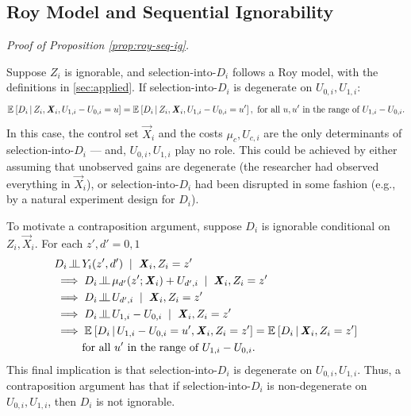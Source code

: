 \subsection{Roy Model and Sequential Ignorability}
\label{appendix:roy-seq-ig}
\textit{Proof of Proposition \ref{prop:roy-seq-ig}.}

Suppose $Z_i$ is ignorable, and selection-into-$D_i$ follows a Roy model, with the definitions in \autoref{sec:applied}.
If selection-into-$D_i$ is degenerate on $U_{0,i}, U_{1,i}$:
\[ \mathbb{E}_{} \left[ D_i \, \middle\vert \, Z_i, \boldsymbol{\mathit{X}}_i, U_{1,i}- U_{0,i} = u \right]
    = \mathbb{E}_{} \left[ D_i \, \middle\vert \, Z_i, \boldsymbol{\mathit{X}}_i, U_{1,i}- U_{0,i} = u' \right],
    \text{ for all } u, u' \text{ in the range of $U_{1,i}- U_{0,i}$.} \]
In this case, the control set $\vec X_i$ and the costs $\mu_c, U_{c,i}$ are the only determinants of selection-into-$D_i$ --- and, $U_{0,i}, U_{1,i}$ play no role.
This could be achieved by either assuming that unobserved gains are degenerate (the researcher had observed everything in $\vec X_i$), or selection-into-$D_i$ had been disrupted in some fashion (e.g., by a natural experiment design for $D_i$).

To motivate a contraposition argument, suppose $D_i$ is ignorable conditional on $Z_i, \vec X_i$.
For each $z', d' = 0, 1$
\begin{align*}
    & D_i \indep Y_i(z', d') \;\; | \;\; \vec X_i, Z_i = z' \\
    &\implies D_i \indep \mu_{d'}(z'; \vec X_i) + U_{d',i} \;\; | \;\; \vec X_i, Z_i = z' \\
    &\implies D_i \indep U_{d',i} \;\; | \;\; \vec X_i, Z_i = z' \\
    &\implies D_i \indep U_{1,i} - U_{0,i} \;\; | \;\; \vec X_i, Z_i = z' \\
    &\implies \Egiven{D_i}{U_{1,i} - U_{0,i} = u', \vec X_i, Z_i = z'}
    = \Egiven{D_i}{\vec X_i, Z_i = z'} \\
    & \;\;\; \;\;\; \;\;\; \text{for all } u' \text{ in the range of $U_{1,i}- U_{0,i}$.}
\end{align*}
This final implication is that selection-into-$D_i$ is degenerate on $U_{0,i}, U_{1,i}$.
Thus, a contraposition argument has that if selection-into-$D_i$ is non-degenerate on $U_{0,i}, U_{1,i}$, then $D_i$ is not ignorable.

